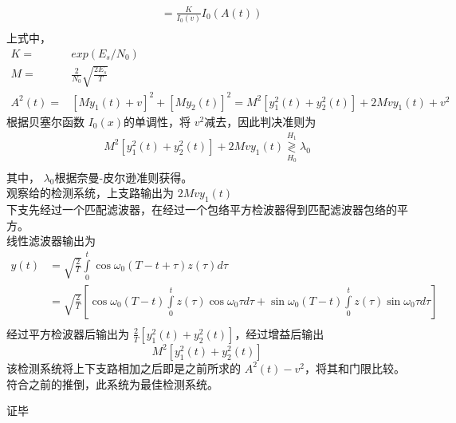 \documentclass{article}
\begin{document}
\begin{enumerate}[1.]
\[\begin{aligned}
 & =\frac{K}{{{I}_{0}}(v)}{{I}_{0}}(A(t)) \\ 
\end{aligned}\]
上式中， \[
	\begin{aligned}
	K = &exp(E_s/N_0)\\
	M=&\frac{2}{N_0}\sqrt{\frac{2E_s}{T}}\\
	A^2(t)=&{{\left[ M{{y}_{1}}(t)+v \right]}^{2}}+{{\left[ M{{y}_{2}}(t) \right]}^{2}}={{M}^{2}}\left[ y_{1}^{2}(t)+y_{2}^{2}(t) \right]+2Mvy_1(t)+v^2
	\end{aligned}
\]
根据贝塞尔函数 $ I_0(x) $的单调性，将 $ v^2 $减去，因此判决准则为 \[
\begin{aligned}
	{{M}^{2}}\left[ y_{1}^{2}(t)+y_{2}^{2}(t) \right]+2Mvy_1(t) \mathop{\gtrless} \limits ^{H_1}_{H_0}\lambda_0\\
\end{aligned}
\]
其中， $ \lambda_0 $根据奈曼-皮尔逊准则获得。\\
观察给的检测系统，上支路输出为 $ 2Mvy_1(t) $\\
下支先经过一个匹配滤波器，在经过一个包络平方检波器得到匹配滤波器包络的平方。\\
线性滤波器输出为 \[\begin{aligned}
 y(t)& =\sqrt{\frac{2}{T}}\int\limits_{0}^{t}{\cos {{\omega }_{0}}(T-t+\tau )z(\tau )}d\tau  \\ 
 & =\sqrt{\frac{2}{T}}\left[ \cos {{\omega }_{0}}(T-t)\int\limits_{0}^{t}{z(\tau )\cos {{\omega }_{0}}\tau }d\tau +\sin {{\omega }_{0}}(T-t)\int\limits_{0}^{t}{z(\tau )\sin {{\omega }_{0}}\tau }d\tau  \right] \\ 
\end{aligned}\]
经过平方检波器后输出为 \(\frac{2}{T}\left[ y_{1}^{2}(t)+y_{2}^{2}(t) \right]\)，经过增益后输出\[{{M}^{2}}\left[ y_{1}^{2}(t)+y_{2}^{2}(t) \right]\]
该检测系统将上下支路相加之后即是之前所求的 $ A^2(t) -v^{2}$，将其和门限比较。符合之前的推倒，此系统为最佳检测系统。

证毕

\end{enumerate}
\end{document}
